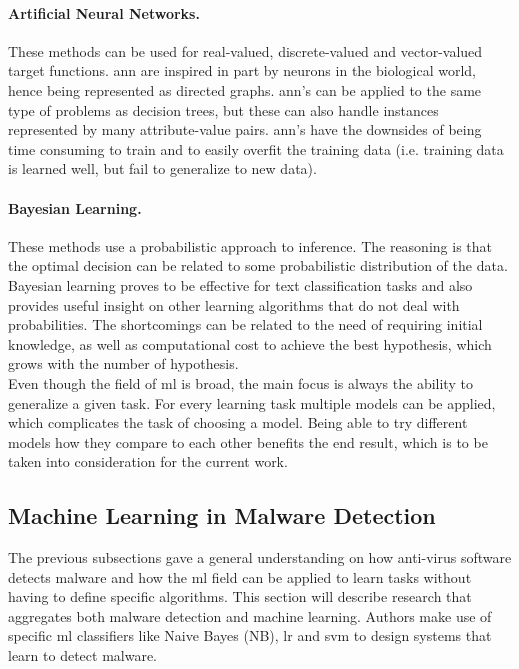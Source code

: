 \documentclass{llncs}
\begin{document}
\paragraph{Artificial Neural Networks.}\cite{mitchell:ml} These methods can be used for real-valued, discrete-valued and vector-valued target functions. \gls{ann} are inspired in part by neurons in the biological world, hence being represented as directed graphs. \gls{ann}'s can be applied to the same type of problems as decision trees, but these can also handle instances represented by many attribute-value pairs. \gls{ann}'s have the downsides of being time consuming to train and to easily overfit the training data (i.e. training data is learned well, but fail to generalize to new data).

\paragraph{Bayesian Learning.}\cite{mitchell:ml} These methods use a probabilistic approach to inference. The reasoning is that the optimal decision can be related to some probabilistic distribution of the data. Bayesian learning proves to be effective for text classification tasks and also provides useful insight on other learning algorithms that do not deal with probabilities. The shortcomings can be related to the need of requiring initial knowledge, as well as computational cost to achieve the best hypothesis, which grows with the number of hypothesis.\\

Even though the field of \gls{ml} is broad, the main focus is always the ability to generalize a given task. For every learning task multiple models can be applied, which complicates the task of choosing a model. Being able to try different models how they compare to each other benefits the end result, which is to be taken into consideration for the current work.

\subsection{Machine Learning in Malware Detection}\label{subsec:ml_md}

The previous subsections gave a general understanding on how anti-virus software detects malware and how the \gls{ml} field can be applied to learn tasks without having to define specific algorithms. This section will describe research that aggregates both malware detection and machine learning. Authors make use of specific \gls{ml} classifiers like Naive Bayes (NB), \gls{lr} and \gls{svm} to design systems that learn to detect malware.
\end{document}
